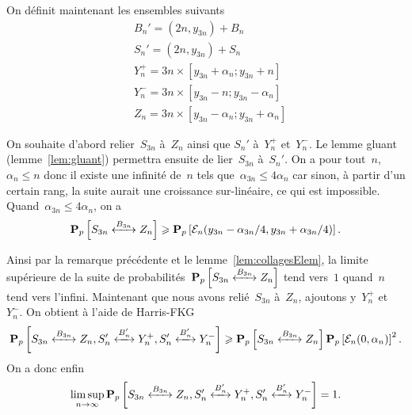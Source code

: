 	On définit maintenant les ensembles suivants
	\begin{align*}
		&B_n' = (2n, y_{3n}) + B_n \\
		&S_n' = (2n, y_{3n}) + S_n \\
		&Y_n^+ = {3n} \times [y_{3n} + \alpha_n; y_{3n} + n] \\
		&Y_n^- = {3n} \times [y_{3n} - n; y_{3n} - \alpha_n] \\
		&Z_n = {3n} \times [y_{3n} - \alpha_n; y_{3n} + \alpha_n]
	\end{align*}
	

	On souhaite d'abord relier~$S_{3n}$ à~$Z_n$ ainsi que $S_n'$ à~$Y_n^+$ et~$Y_n^-$. Le lemme gluant (lemme~\ref{lem:gluant}) permettra ensuite de lier~$S_{3n}$ à~$S_n'$. On a pour tout~$n$, $\alpha_n \leq n$ donc il existe une infinité de~$n$ tels que~$\alpha_{3n} \leq 4\alpha_n$ car sinon, à partir d'un certain rang, la suite aurait une croissance sur-linéaire, ce qui est impossible. Quand~$\alpha_{3n} \leq 4\alpha_n$, on a
	\[
		\Pp{\relie[B_{3n}]{S_{3n}}{Z_n}} \geq \Pp{\mathcal{E}_n(y_{3n} - \alpha_{3n}/4, y_{3n} + \alpha_{3n}/4)}.
	\]

	Ainsi par la remarque précédente et le lemme~\ref{lem:collagesElem}, la limite supérieure de la suite de probabilités~$\Pp{\relie[B_{3n}]{S_{3n}}{Z_n}}$ tend vers~$1$ quand~$n$ tend vers l'infini. Maintenant que nous avons relié~$S_{3n}$ à~$Z_n$, ajoutons y~$Y_n^+$ et~$Y_n^-$. On obtient à l'aide de Harris-FKG
	\[
		\Pp{\relie[B_{3n}]{S_{3n}}{Z_n}, \relie[B_n']{S_n'}{Y_n^+}, \relie[B_n']{S_n'}{Y_n^-}} \geq \Pp{\relie[B_{3n}]{S_{3n}}{Z_n} }\Pp{\mathcal{E}_n(0, \alpha_n)}^2.
	\]
	On a donc enfin
	\[ 
		\limsup_{n \to \infty} \Pp{\relie[B_{3n}]{S_{3n}}{Z_n}, \relie[B_n']{S_n'}{Y_n^+}, \relie[B_n']{S_n'}{Y_n^-}} = 1.
	\]


